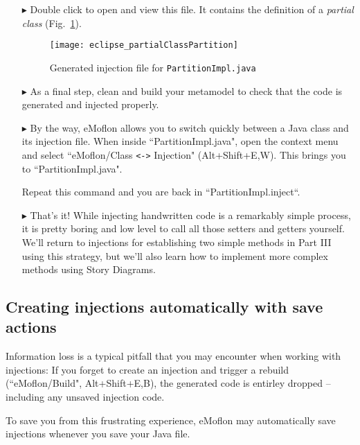 \begin{itemize}
\item[$\blacktriangleright$] Double click to open and view this file. It contains the definition of a \textit{partial class}
(Fig.~\ref{eclipse:injection_partialClassPartition}).

\begin{figure}[htbp]
    \centering
    \texttt{[image: eclipse\_partialClassPartition]}
    \caption{Generated injection file for \texttt{PartitionImpl.java}}
    \label{eclipse:injection_partialClassPartition}
\end{figure}

\clearpage

\item[$\blacktriangleright$] As a final step, clean and build your metamodel to check that the code is generated and injected properly.

\item[$\blacktriangleright$] By the way, eMoflon allows you to switch quickly between a Java class and its injection file.
When inside ``PartitionImpl.java", open the context menu and select ``eMoflon/Class \verb|<->| Injection" (Alt+Shift+E,W).
This brings you to ``PartitionImpl.java".

Repeat this command and you are back in ``PartitionImpl.inject``.


\item[$\blacktriangleright$] That's it! While injecting handwritten code is a remarkably simple process, it is pretty boring and low level to call all those
setters and getters yourself. We'll return to injections for establishing two simple methods in Part III using this strategy, but we'll also learn how to
implement more complex methods using Story Diagrams.
 
\end{itemize}

\subsection*{Creating injections automatically with save actions}

Information loss is a typical pitfall that you may encounter when working with injections:
If you forget to create an injection and trigger a rebuild (``eMoflon/Build", Alt+Shift+E,B), the generated code is entirley dropped -- including any unsaved injection code.

To save you from this frustrating experience, eMoflon may automatically save injections whenever you save your Java file.

